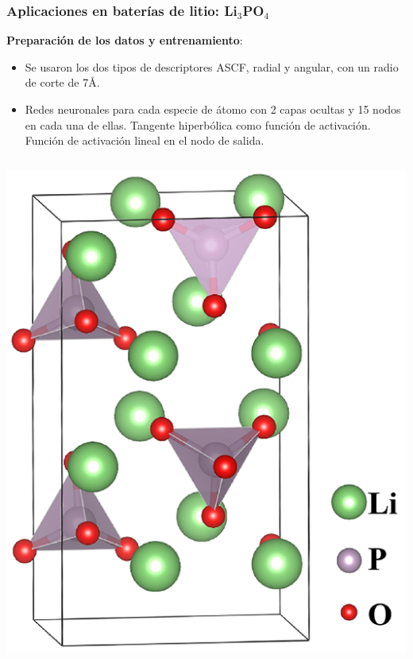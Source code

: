 \documentclass[aspectratio=169]{beamer}
\let\oldtextbf\textbf
\renewcommand{\textbf}[1]{\textcolor{nordblue}{\oldtextbf{#1}}}
\begin{document}
    \begin{frame}
        \frametitle{Aplicaciones en baterías de litio: Li$_3$PO$_4$}
            
        \textbf{Preparación de los datos y entrenamiento}:
        \begin{itemize}
            \item Se usaron los dos tipos de descriptores ASCF, radial y angular, 
                con un radio de corte de 7\AA.
            \item Redes neuronales para cada especie de átomo con 2 capas ocultas
                y 15 nodos en cada una de ellas. Tangente hiperbólica como función
                de activación. Función de activación lineal en el nodo de salida.
        \end{itemize}

        \pause

        \begin{columns}
            \begin{center}
                \includegraphics[width=\columnwidth]{Li3PO4-estructura.png}
            \end{center}


\end{columns}
\end{frame}
\end{document}
